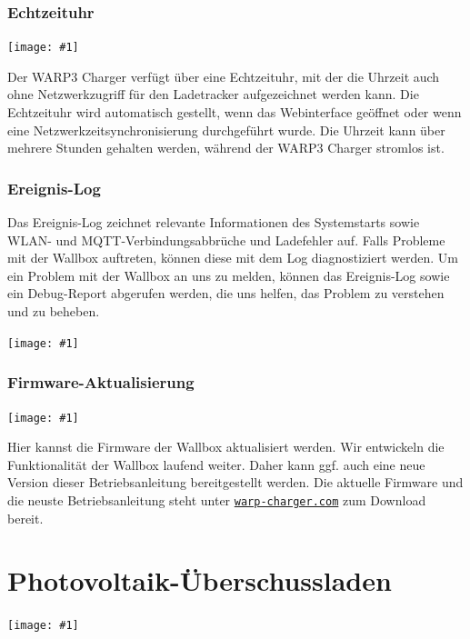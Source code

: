 \documentclass[a4paper,10pt]{article}
\newcommand{\gfx}[1]{\texttt{[image: \#1]}}
\newcommand\rurl[2]{%
  \href{#1}{\nolinkurl{#2}}%
}
\begin{document}
\begin{multicols*}{2}
    \vspace{-0.2cm}
    \subsubsection{Echtzeituhr}

    \gfx{./img_warp3/resized/web_rtc}

    Der WARP3 Charger verfügt über eine Echtzeituhr, mit der die Uhrzeit auch ohne Netzwerkzugriff für den Ladetracker aufgezeichnet werden kann. Die Echtzeituhr wird automatisch gestellt, wenn das Webinterface geöffnet oder wenn eine Netzwerkzeitsynchronisierung durchgeführt wurde. Die Uhrzeit kann über mehrere Stunden gehalten werden, während der WARP3 Charger stromlos ist.


    \subsubsection{Ereignis-Log}

    Das Ereignis-Log zeichnet relevante Informationen des Systemstarts sowie WLAN- und MQTT-Ver\-bin\-dungs\-abbrüche und Ladefehler auf.
    Falls Probleme mit der Wallbox auftreten, können diese mit dem Log diagnostiziert werden.
    Um ein Problem mit der Wallbox an uns zu melden, können das Ereignis-Log
    sowie ein Debug-Report abgerufen werden, die uns helfen, das Problem zu verstehen und zu beheben.

    \gfx{./img_warp3/resized/web_event_log}

    \subsubsection{Firmware-Aktualisierung}\label{firmware-update}

    \gfx{./img_warp3/resized/web_firmware_update}

    Hier kannst die Firmware der Wallbox aktualisiert werden. Wir entwickeln die Funktionalität
    der Wallbox laufend weiter. Daher kann ggf. auch eine neue
    Version dieser Betriebsanleitung bereitgestellt werden.
    Die aktuelle Firmware und die neuste Betriebsanleitung steht unter
    \rurl{https://warp-charger.com}{warp-charger.com} zum Download bereit.

    \newpage
	\section{Photovoltaik-Überschussladen}\label{pv_charge}
	\gfx{./img_warp3/resized/web_pv_excess_settings}


\end{multicols*}
\end{document}
